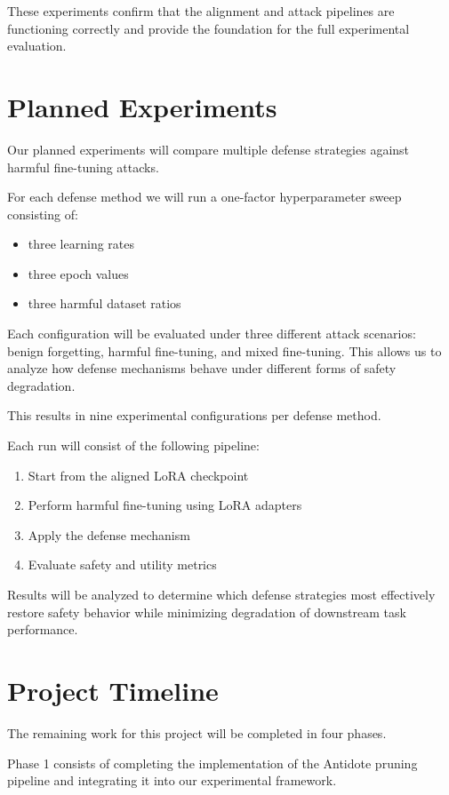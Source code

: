 \documentclass[11pt]{article}
\begin{document}
These experiments confirm that the alignment and attack pipelines are functioning correctly and provide the foundation for the full experimental evaluation.

\section{Planned Experiments}

Our planned experiments will compare multiple defense strategies against harmful fine-tuning attacks.

For each defense method we will run a one-factor hyperparameter sweep consisting of:

\begin{itemize}
\item three learning rates
\item three epoch values
\item three harmful dataset ratios
\end{itemize}

Each configuration will be evaluated under three different attack scenarios: benign forgetting, harmful fine-tuning, and mixed fine-tuning. This allows us to analyze how defense mechanisms behave under different forms of safety degradation.

This results in nine experimental configurations per defense method.

Each run will consist of the following pipeline:

\begin{enumerate}
\item Start from the aligned LoRA checkpoint
\item Perform harmful fine-tuning using LoRA adapters
\item Apply the defense mechanism
\item Evaluate safety and utility metrics
\end{enumerate}

Results will be analyzed to determine which defense strategies most effectively restore safety behavior while minimizing degradation of downstream task performance.

\section{Project Timeline}

The remaining work for this project will be completed in four phases.

Phase 1 consists of completing the implementation of the Antidote pruning pipeline and integrating it into our experimental framework.
\end{document}
